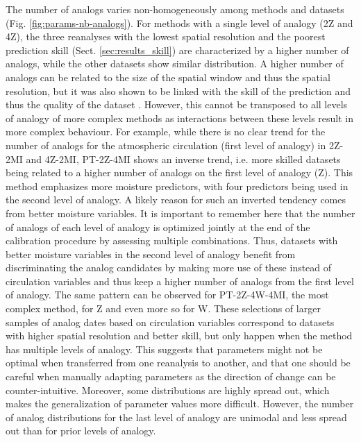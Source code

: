 \documentclass[alpha-refs]{wiley-article}
\begin{document}
The number of analogs varies non-homogeneously among methods and datasets (Fig. \ref{fig:params-nb-analogs}). For methods with a single level of analogy (2Z and 4Z), the three reanalyses with the lowest spatial resolution and the poorest prediction skill (Sect. \ref{sec:results_skill}) are characterized by a higher number of analogs, while the other datasets show similar distribution. A higher number of analogs can be related to the size of the spatial window and thus the spatial resolution, but it was also shown to be linked with the skill of the prediction and thus the quality of the dataset \citep{Horton2017b}. However, this cannot be transposed to all levels of analogy of more complex methods as interactions between these levels result in more complex behaviour. For example, while there is no clear trend for the number of analogs for the atmospheric circulation (first level of analogy) in 2Z-2MI and 4Z-2MI, PT-2Z-4MI shows an inverse trend, i.e. more skilled datasets being related to a higher number of analogs on the first level of analogy (Z). This method emphasizes more moisture predictors, with four predictors being used in the second level of analogy. A likely reason for such an inverted tendency comes from better moisture variables. It is important to remember here that the number of analogs of each level of analogy is optimized jointly at the end of the calibration procedure by assessing multiple combinations. Thus, datasets with better moisture variables in the second level of analogy benefit from discriminating the analog candidates by making more use of these instead of circulation variables and thus keep a higher number of analogs from the first level of analogy. The same pattern can be observed for PT-2Z-4W-4MI, the most complex method, for Z and even more so for W. These selections of larger samples of analog dates based on circulation variables correspond to datasets with higher spatial resolution and better skill, but only happen when the method has multiple levels of analogy. This suggests that parameters might not be optimal when transferred from one reanalysis to another, and that one should be careful when manually adapting parameters as the direction of change can be counter-intuitive. Moreover, some distributions are highly spread out, which makes the generalization of parameter values more difficult. However, the number of analog distributions for the last level of analogy are unimodal and less spread out than for prior levels of analogy.
\end{document}
